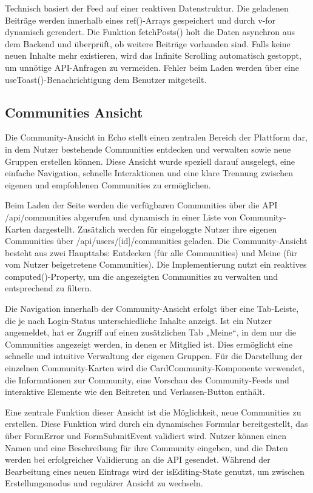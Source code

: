 \documentclass[a4paper,12pt]{article}
\begin{document}
Technisch basiert der Feed auf einer reaktiven Datenstruktur. Die geladenen
Beiträge werden innerhalb eines ref()-Arrays gespeichert und durch v-for
dynamisch gerendert. Die Funktion fetchPosts() holt die Daten asynchron aus dem
Backend und überprüft, ob weitere Beiträge vorhanden sind. Falls keine neuen
Inhalte mehr existieren, wird das Infinite Scrolling automatisch gestoppt, um
unnötige API-Anfragen zu vermeiden. Fehler beim Laden werden über eine
useToast()-Benachrichtigung dem Benutzer mitgeteilt.

\subsection{Communities Ansicht}
Die Community-Ansicht in Echo stellt einen zentralen Bereich der
Plattform dar, in dem Nutzer bestehende Communities entdecken und verwalten
sowie neue Gruppen erstellen können. Diese Ansicht wurde speziell darauf
ausgelegt, eine einfache Navigation, schnelle Interaktionen und eine klare
Trennung zwischen eigenen und empfohlenen Communities zu ermöglichen.

Beim Laden der Seite werden die verfügbaren Communities über die API
/api/communities abgerufen und dynamisch in einer Liste von Community-Karten
dargestellt. Zusätzlich werden für eingeloggte Nutzer ihre eigenen Communities
über /api/users/[id]/communities geladen. Die Community-Ansicht besteht aus
zwei Haupttabs: Entdecken (für alle Communities) und Meine (für vom Nutzer
beigetretene Communities). Die Implementierung nutzt ein reaktives
computed()-Property, um die angezeigten Communities zu verwalten und
entsprechend zu filtern.

Die Navigation innerhalb der Community-Ansicht erfolgt über eine Tab-Leiste,
die je nach Login-Status unterschiedliche Inhalte anzeigt. Ist ein Nutzer
angemeldet, hat er Zugriff auf einen zusätzlichen Tab „Meine“, in dem nur die
Communities angezeigt werden, in denen er Mitglied ist. Dies ermöglicht eine
schnelle und intuitive Verwaltung der eigenen Gruppen. Für die Darstellung der
einzelnen Community-Karten wird die CardCommunity-Komponente verwendet, die
Informationen zur Community, eine Vorschau des Community-Feeds und interaktive
Elemente wie den Beitreten und Verlassen-Button enthält.

Eine zentrale Funktion dieser Ansicht ist die Möglichkeit, neue Communities zu
erstellen. Diese Funktion wird durch ein dynamisches Formular bereitgestellt,
das über FormError und FormSubmitEvent validiert wird. Nutzer können einen
Namen und eine Beschreibung für ihre Community eingeben, und die Daten werden
bei erfolgreicher Validierung an die API gesendet. Während der Bearbeitung
eines neuen Eintrags wird der isEditing-State genutzt, um zwischen
Erstellungsmodus und regulärer Ansicht zu wechseln.
\end{document}
